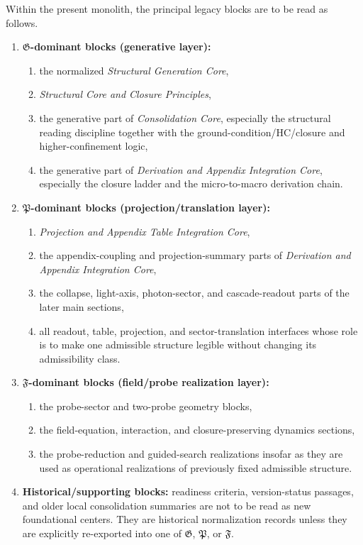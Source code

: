 \begin{definition}
\label{def:layer-assignment-legacy-core-blocks}
Within the present monolith, the principal legacy blocks are to be read as
follows.
\begin{enumerate}[leftmargin=2em,label=(L\arabic*)]
\item \textbf{$\mathfrak G$-dominant blocks (generative layer):}
\begin{enumerate}[leftmargin=2.5em,label=(\alph*)]
\item the normalized \emph{Structural Generation Core},
\item \emph{Structural Core and Closure Principles},
\item the generative part of \emph{ Consolidation Core}, especially the
structural reading discipline together with the ground-condition/HC/closure and
higher-confinement logic,
\item the generative part of \emph{ Derivation and Appendix Integration Core},
especially the closure ladder and the micro-to-macro derivation chain.
\end{enumerate}
\item \textbf{$\mathfrak P$-dominant blocks (projection/translation layer):}
\begin{enumerate}[leftmargin=2.5em,label=(\alph*)]
\item \emph{ Projection and Appendix Table Integration Core},
\item the appendix-coupling and projection-summary parts of \emph{ Derivation and Appendix Integration Core},
\item the collapse, light-axis, photon-sector, and cascade-readout parts of the later main sections,
\item all readout, table, projection, and sector-translation interfaces whose
role is to make one admissible structure legible without changing its
admissibility class.
\end{enumerate}
\item \textbf{$\mathfrak F$-dominant blocks (field/probe realization layer):}
\begin{enumerate}[leftmargin=2.5em,label=(\alph*)]
\item the probe-sector and two-probe geometry blocks,
\item the field-equation, interaction, and closure-preserving dynamics sections,
\item the probe-reduction and guided-search realizations insofar as they are
used as operational realizations of previously fixed admissible structure.
\end{enumerate}
\item \textbf{Historical/supporting blocks:} readiness criteria, version-status
passages, and older local consolidation summaries are not to be read as new
foundational centers. They are historical normalization records unless they are
explicitly re-exported into one of $\mathfrak G$, $\mathfrak P$, or
$\mathfrak F$.
\end{enumerate}
\end{definition}

